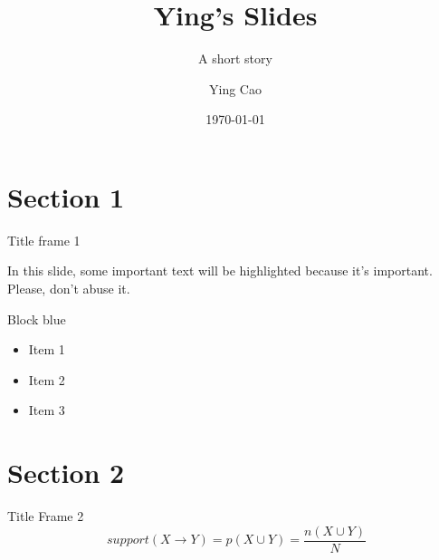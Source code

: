 \documentclass {beamer}
\title[] {Ying's Slides}
\subtitle{A short story}
\author {Ying Cao}
\institute {}
\date {\today}
\begin{document}

\begin {frame}
\titlepage
\end {frame}

\section {Section 1}

\begin {frame} {Title frame 1}

In this slide, some important text will be
\alert{highlighted} because it's important.
Please, don't abuse it.

\begin {block} {Block blue}
\begin {itemize}
\item Item 1
\item Item 2
\item Item 3
\end {itemize}
\end {block}
\end {frame}

\section {Section 2}
\begin {frame} {Title Frame 2}
\[\ support(X \to Y) = p(X \cup Y) = \frac { {n(X \cup Y)}} {N}\]
\end {frame}
\end{document}
